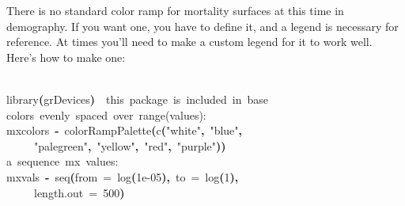 \documentclass[a4paper]{article}
\newcommand{\hlnumber}[1]{\textcolor[rgb]{0.0823529411764706,0.0784313725490196,0.709803921568627}{#1}}%
\newcommand{\hlfunctioncall}[1]{\textcolor[rgb]{1,0,0}{#1}}%
\newcommand{\hlstring}[1]{\textcolor[rgb]{0.6,0.6,1}{#1}}%
\newcommand{\hlkeyword}[1]{\textcolor[rgb]{0,0,0}{\textbf{#1}}}%
\newcommand{\hlargument}[1]{\textcolor[rgb]{0.694117647058824,0.247058823529412,0.0196078431372549}{#1}}%
\newcommand{\hlcomment}[1]{\textcolor[rgb]{0.8,0.8,0.8}{#1}}%
\newcommand{\hlassignement}[1]{\textcolor[rgb]{0.215686274509804,0.215686274509804,0.384313725490196}{\textbf{#1}}}%
\newcommand{\hlsymbol}[1]{\textcolor[rgb]{0,0,0}{#1}}%
\newcommand{\hlprompt}[1]{\textcolor[rgb]{0,0,0}{#1}}%
\newcommand{\hlstd}[1]{\textcolor[rgb]{0,0,0}{#1}}%
\newenvironment{Houtput}{\raggedright}{%
%
}
\begin{document}
There is no standard color ramp for mortality surfaces at this time in demography. If you want one, you have to define it, and a legend is necessary for reference. At times you'll need to make a custom legend for it to work well. Here's how to make one:

\begin{Houtput}
\hspace*{\fill}\\
\hlstd{}\ttfamily\noindent
\hlprompt{\usebox{\hlnormalsizeboxgreaterthan}{\ }}\hlfunctioncall{library}\hlkeyword{(}\hlsymbol{grDevices}\hlkeyword{)}{\ }{\ }\hlcomment{\usebox{\hlnormalsizeboxhash}{\ }this{\ }package{\ }is{\ }included{\ }in{\ }base}\mbox{}
\normalfont
\hspace*{\fill}\\
\hlstd{}\ttfamily\noindent
\hlprompt{\usebox{\hlnormalsizeboxgreaterthan}{\ }}\hlcomment{\usebox{\hlnormalsizeboxhash}{\ }colors{\ }evenly{\ }spaced{\ }over{\ }range(values):}\mbox{}
\normalfont
\hspace*{\fill}\\
\hlstd{}\ttfamily\noindent
\hlprompt{\usebox{\hlnormalsizeboxgreaterthan}{\ }}\hlsymbol{mxcolors}{\ }\hlassignement{\usebox{\hlnormalsizeboxlessthan}-}{\ }\hlfunctioncall{colorRampPalette}\hlkeyword{(}\hlfunctioncall{c}\hlkeyword{(}\hlstring{"white"}\hlkeyword{,}{\ }\hlstring{"blue"}\hlkeyword{,}\hspace*{\fill}\\
\hlstd{}\hlprompt{{\ }}{\ }{\ }{\ }{\ }\hlstring{"palegreen"}\hlkeyword{,}{\ }\hlstring{"yellow"}\hlkeyword{,}{\ }\hlstring{"red"}\hlkeyword{,}{\ }\hlstring{"purple"}\hlkeyword{)}\hlkeyword{)}\mbox{}
\normalfont
\hspace*{\fill}\\
\hlstd{}\ttfamily\noindent
\hlprompt{\usebox{\hlnormalsizeboxgreaterthan}{\ }}\hlcomment{\usebox{\hlnormalsizeboxhash}{\ }a{\ }sequence{\ }mx{\ }values:}\mbox{}
\normalfont
\hspace*{\fill}\\
\hlstd{}\ttfamily\noindent
\hlprompt{\usebox{\hlnormalsizeboxgreaterthan}{\ }}\hlsymbol{mxvals}{\ }\hlassignement{\usebox{\hlnormalsizeboxlessthan}-}{\ }\hlfunctioncall{seq}\hlkeyword{(}\hlargument{from}{\ }\hlargument{=}{\ }\hlfunctioncall{log}\hlkeyword{(}\hlnumber{1e-05}\hlkeyword{)}\hlkeyword{,}{\ }\hlargument{to}{\ }\hlargument{=}{\ }\hlfunctioncall{log}\hlkeyword{(}\hlnumber{1}\hlkeyword{)}\hlkeyword{,}\hspace*{\fill}\\
\hlstd{}\hlprompt{{\ }}{\ }{\ }{\ }{\ }\hlargument{length.out}{\ }\hlargument{=}{\ }\hlnumber{500}\hlkeyword{)}\mbox{}

\end{Houtput}
\end{document}
